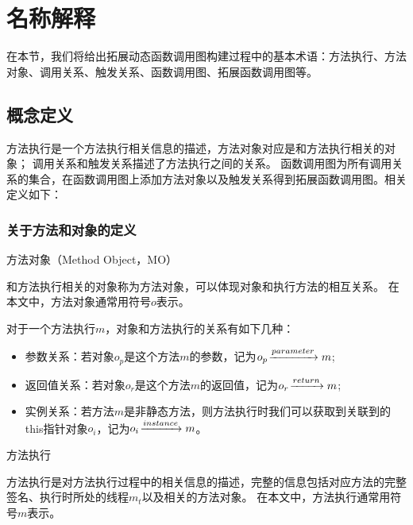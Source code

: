 \chapter{名称解释}
\label{chp:definition}


在本节，我们将给出拓展动态函数调用图构建过程中的基本术语：方法执行、方法对象、调用关系、触发关系、函数调用图、拓展函数调用图等。

\section{概念定义}
方法执行是一个方法执行相关信息的描述，方法对象对应是和方法执行相关的对象；
调用关系和触发关系描述了方法执行之间的关系。
函数调用图为所有调用关系的集合，在函数调用图上添加方法对象以及触发关系得到拓展函数调用图。相关定义如下：

\subsection{关于方法和对象的定义}

\begin{myDef}
	方法对象（Method Object，MO）
\end{myDef}
	和方法执行相关的对象称为方法对象，可以体现对象和执行方法的相互关系。
	在本文中，方法对象通常用符号$o$表示。
	

	对于一个方法执行$m$，对象和方法执行的关系有如下几种：
	\begin{itemize}
		\item 参数关系：若对象$o_p$是这个方法$m$的参数，记为$o_p \joinrel\xrightarrow{parameter} m$;%
		\item 返回值关系：若对象$o_r$是这个方法$m$的返回值，记为$o_r \joinrel\xrightarrow{return} m$;%
		\item 实例关系：若方法$m$是非静态方法，则方法执行时我们可以获取到关联到的this指针对象$o_i$，记为$o_i \joinrel\xrightarrow{instance} m$。%
	\end{itemize}

\begin{myDef}方法执行\end{myDef}
方法执行是对方法执行过程中的相关信息的描述，完整的信息包括对应方法的完整签名、执行时所处的线程$m_t$以及相关的方法对象。
在本文中，方法执行通常用符号$m$表示。

